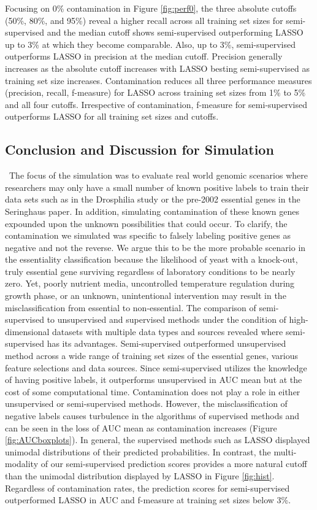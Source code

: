 \documentclass{bmcart}
\begin{document}
Focusing on 0\% contamination in Figure \ref{fig:perf0}, the three absolute cutoffs (50\%, 80\%, and 95\%) reveal a higher recall across all training set sizes for semi-supervised and the median cutoff shows semi-supervised outperforming LASSO up to 3\% at which they become comparable. Also, up to 3\%, semi-supervised outperforms LASSO in precision at the median cutoff. Precision generally increases as the absolute cutoff increases with LASSO besting semi-supervised as training set size increases. Contamination reduces all three performance measures (precision, recall, f-measure) for LASSO across training set sizes from 1\% to 5\% and all four cutoffs. Irrespective of contamination, f-measure for semi-supervised outperforms LASSO for all training set sizes and cutoffs.

\subsection*{Conclusion and Discussion for Simulation}\label{subsubsection:conclusion}\
The focus of the simulation was to evaluate real world genomic scenarios where researchers may only have a small number of known positive labels to train their data sets such as in the Drosphilia study \citep{Biehs2010a} or the pre-2002 essential genes in the Seringhaus paper. In addition, simulating contamination of these known genes expounded upon the unknown possibilities that could occur. To clarify, the contamination we simulated was specific to falsely labeling positive genes as negative and not the reverse. We argue this to be the more probable scenario in the essentiality classification because the likelihood of yeast with a knock-out, truly essential gene surviving regardless of laboratory conditions to be nearly zero. Yet, poorly nutrient media, uncontrolled temperature regulation during growth phase, or an unknown, unintentional intervention may result in the misclassification from essential to non-essential. The comparison of semi-supervised to unsupervised and supervised methods under the condition of high-dimensional datasets with multiple data types and sources revealed where semi-supervised has its advantages. Semi-supervised outperformed unsupervised method across a wide range of training set sizes of the essential genes, various feature selections and data sources. Since semi-supervised utilizes the knowledge of having positive labels, it outperforms unsupervised in AUC mean but at the cost of some computational time. Contamination does not play a role in either unsupervised or semi-supervised methods. However, the misclassification of negative labels causes turbulence in the algorithms of supervised methods and can be seen in the loss of AUC mean as contamination increases (Figure \ref{fig:AUCboxplots}). In general, the supervised methods such as LASSO displayed unimodal distributions of their predicted probabilities. In contrast, the multi-modality of our semi-supervised prediction scores provides a more natural cutoff than the unimodal distribution displayed by LASSO in Figure \ref{fig:hist}. Regardless of contamination rates, the prediction scores for semi-supervised outperformed LASSO in AUC and f-measure at training set sizes below 3\%.
\end{document}
